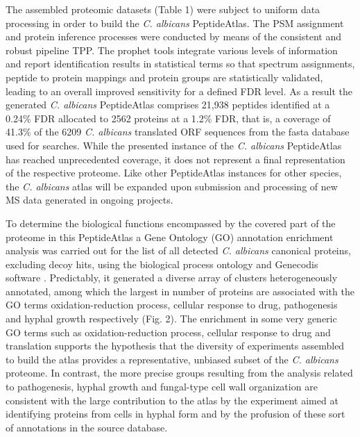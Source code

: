The assembled proteomic datasets (Table 1) were subject to
uniform data processing in order to build the \textit{C. albicans}
PeptideAtlas. The PSM assignment and protein inference
processes were conducted by means of the consistent and
robust pipeline TPP. The prophet tools integrate various levels
of information and report identification results in statistical
terms so that spectrum assignments, peptide to protein
mappings and protein groups are statistically validated, leading
to an overall improved sensitivity for a defined FDR level. As a
result the generated \textit{C. albicans} PeptideAtlas comprises 21,938
peptides identified at a 0.24\% FDR allocated to 2562 proteins at a
1.2\% FDR, that is, a coverage of 41.3\% of the 6209 \textit{C. albicans}
translated ORF sequences from the fasta database used for
searches. While the presented instance of the \textit{C. albicans}
PeptideAtlas has reached unprecedented coverage, it does
not represent a final representation of the respective proteome.
Like other PeptideAtlas instances for other species, the
\textit{C. albicans} atlas will be expanded upon submission and
processing of new MS data generated in ongoing projects.

To determine the biological functions encompassed by the
covered part of the proteome in this PeptideAtlas a Gene
Ontology (GO) annotation enrichment analysis was carried out
for the list of all detected \textit{C. albicans} canonical proteins, 
excluding decoy hits, using the biological process ontology and
Genecodis software \citep{Tabas-Madrid2012}. Predictably, it generated a diverse array
of clusters heterogeneously annotated, among which the
largest in number of proteins are associated with the GO
terms oxidation-reduction process, cellular response to drug, pathogenesis
 and hyphal growth respectively (Fig. 2). The enrichment in
some very generic GO terms such as oxidation-reduction process,
cellular response to drug and translation supports the hypothesis
that the diversity of experiments assembled to build the atlas
provides a representative, unbiased subset of the \textit{C. albicans}
proteome. In contrast, the more precise groups resulting from
the analysis related to pathogenesis, hyphal growth and fungal-type
cell wall organization are consistent with the large contribution to
the atlas by the experiment aimed at identifying proteins from
cells in hyphal form and by the profusion of these sort of
annotations in the source database.

